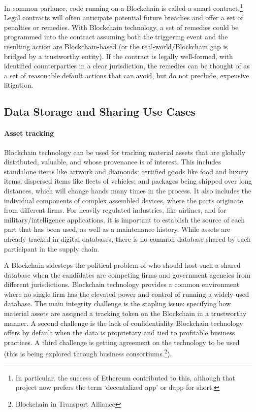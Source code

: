In common parlance, code running on a Blockchain is called a smart contract.\footnote{In particular, the success of Ethereum contributed to this, although that project now prefers the term `decentalized app' or dapp for short.} Legal contracts will often anticipate potential future breaches and offer a set of penalties or remedies.
With Blockchain technology, a set of remedies could be programmed into the contract assuming both the triggering event and the resulting action are Blockchain-based (or the real-world/Blockchain gap is bridged by a trustworthy entity).
If the contract is legally well-formed, with identified counterparties in a clear jurisdiction, the remedies can be thought of as a set of reasonable default actions that can avoid, but do not preclude, expensive litigation. 


\subsection{Data Storage and Sharing Use Cases}

\paragraph{Asset tracking} 

Blockchain technology can be used for tracking material assets that are globally distributed, valuable, and whose provenance is of interest.
This includes standalone items like artwork and diamonds; certified goods like food and luxury items; dispersed items like fleets of vehicles; and packages being shipped over long distances, which will change hands many times in the process. 
It also includes the individual components of complex assembled devices, where the parts originate from different firms. 
For heavily regulated industries, like airlines, and for military/intelligence applications, it is important to establish the source of each part that has been used, as well as a maintenance history.
While assets are already tracked in digital databases, there is no common database shared by each participant in the supply chain.  

A Blockchain sidesteps the political problem of who should host such a shared database when the candidates are competing firms and government agencies from different jurisdictions. 
Blockchain technology provides a common environment where no single firm has the elevated power and control of running a widely-used database. 
The main integrity challenge is the stapling issue: specifying how material assets are assigned a tracking token on the Blockchain in a trustworthy manner. 
A second challenge is the lack of confidentiality Blockchain technology offers by default  when the data is proprietary and tied to profitable business practices.
A third challenge is getting agreement on the technology to be used (this is being explored through business consortiums.\footnote{\eg Blockchain in Transport Alliance}).


